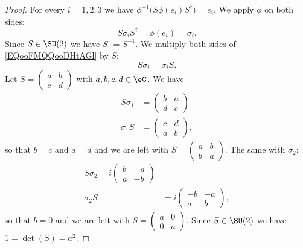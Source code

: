 \begin{proof}
    For every \( i=1,2,3\) we have \( \phi^{-1}\big( S\phi(e_i)S^{\dag} \big)=e_i\). We apply \( \phi\) on both sides:
    \begin{equation}        \label{EQooFMQQooDHtAGl}
        S\sigma_iS^{\dag}=\phi(e_i)=\sigma_i.
    \end{equation}
    Since \( S\in \SU(2)\) we have \( S^{\dag}=S^{-1}\). We multiply both sides of \eqref{EQooFMQQooDHtAGl} by \( S\):
    \begin{equation}
        S\sigma_i=\sigma_iS.
    \end{equation}
    Let \( S=\begin{pmatrix}
        a    &   b    \\ 
        c    &   d    
    \end{pmatrix}\) with \( a,b,c,d\in \eC\). We have
    \begin{subequations}
        \begin{align}
            S\sigma_1&=\begin{pmatrix}
                b    &   a    \\ 
                d    &   c    
            \end{pmatrix}\\
            \sigma_1S&=\begin{pmatrix}
                c    &   d    \\ 
                a    &   b    
            \end{pmatrix},
        \end{align}
    \end{subequations}
    so that \( b=c\) and \( a=d\) and we are left with \( S=\begin{pmatrix}
        a    &   b    \\ 
        b    &   a    
    \end{pmatrix}\). The same with \( \sigma_2\):
    \begin{subequations}
        \begin{align}
            S\sigma_2=i\begin{pmatrix}
                b    &   -a    \\ 
                a    &   -b    
            \end{pmatrix}\\
            \sigma_2S&=i\begin{pmatrix}
                 -b   &   -a    \\ 
                a    &   b    
            \end{pmatrix},
        \end{align}
    \end{subequations}
    so that \( b=0\) and we are left with \( S=\begin{pmatrix}
        a    &   0    \\ 
        0    &   a    
    \end{pmatrix}\).
    Since \( S\in \SU(2)\) we have \( 1=\det(S)=a^2\).
    

\end{proof}
